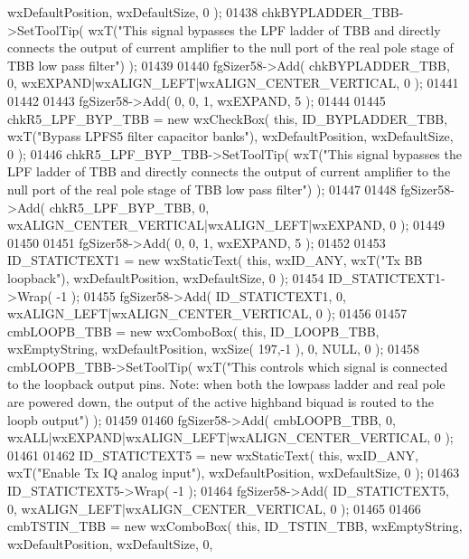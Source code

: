 \begin{DoxyCode}
      wxDefaultPosition, wxDefaultSize, 0 );
01438     chkBYPLADDER_TBB->SetToolTip( wxT(\textcolor{stringliteral}{"This signal bypasses the LPF ladder of TBB and directly connects the
       output of current amplifier to the null port of the real pole stage of TBB low pass filter"}) );
01439     
01440     fgSizer58->Add( chkBYPLADDER_TBB, 0, wxEXPAND|wxALIGN\_LEFT|wxALIGN\_CENTER\_VERTICAL, 0 );
01441     
01442     
01443     fgSizer58->Add( 0, 0, 1, wxEXPAND, 5 );
01444     
01445     chkR5_LPF_BYP_TBB = \textcolor{keyword}{new} wxCheckBox( \textcolor{keyword}{this}, ID_BYPLADDER_TBB, wxT(\textcolor{stringliteral}{"Bypass LPFS5 filter capacitor banks"}),
       wxDefaultPosition, wxDefaultSize, 0 );
01446     chkR5_LPF_BYP_TBB->SetToolTip( wxT(\textcolor{stringliteral}{"This signal bypasses the LPF ladder of TBB and directly connects
       the output of current amplifier to the null port of the real pole stage of TBB low pass filter"}) );
01447     
01448     fgSizer58->Add( chkR5_LPF_BYP_TBB, 0, wxALIGN\_CENTER\_VERTICAL|wxALIGN\_LEFT|wxEXPAND, 0 );
01449     
01450     
01451     fgSizer58->Add( 0, 0, 1, wxEXPAND, 5 );
01452     
01453     ID_STATICTEXT1 = \textcolor{keyword}{new} wxStaticText( \textcolor{keyword}{this}, wxID\_ANY, wxT(\textcolor{stringliteral}{"Tx BB loopback"}), wxDefaultPosition, 
      wxDefaultSize, 0 );
01454     ID_STATICTEXT1->Wrap( -1 );
01455     fgSizer58->Add( ID_STATICTEXT1, 0, wxALIGN\_LEFT|wxALIGN\_CENTER\_VERTICAL, 0 );
01456     
01457     cmbLOOPB_TBB = \textcolor{keyword}{new} wxComboBox( \textcolor{keyword}{this}, ID_LOOPB_TBB, wxEmptyString, wxDefaultPosition, wxSize( 197,-1 ), 
      0, NULL, 0 ); 
01458     cmbLOOPB_TBB->SetToolTip( wxT(\textcolor{stringliteral}{"This controls which signal is connected to the loopback output pins.
       Note: when both the lowpass ladder and real pole are powered down, the output of the active highband biquad is
       routed to the loopb output"}) );
01459     
01460     fgSizer58->Add( cmbLOOPB_TBB, 0, wxALL|wxEXPAND|wxALIGN\_LEFT|wxALIGN\_CENTER\_VERTICAL, 0 );
01461     
01462     ID_STATICTEXT5 = \textcolor{keyword}{new} wxStaticText( \textcolor{keyword}{this}, wxID\_ANY, wxT(\textcolor{stringliteral}{"Enable Tx IQ analog input"}), wxDefaultPosition,
       wxDefaultSize, 0 );
01463     ID_STATICTEXT5->Wrap( -1 );
01464     fgSizer58->Add( ID_STATICTEXT5, 0, wxALIGN\_LEFT|wxALIGN\_CENTER\_VERTICAL, 0 );
01465     
01466     cmbTSTIN_TBB = \textcolor{keyword}{new} wxComboBox( \textcolor{keyword}{this}, ID_TSTIN_TBB, wxEmptyString, wxDefaultPosition, wxDefaultSize, 0, 

\end{DoxyCode}
